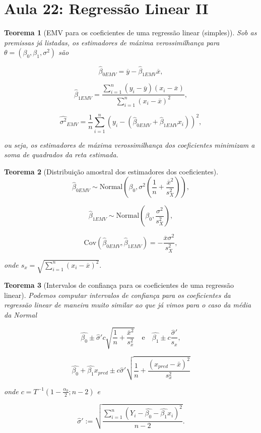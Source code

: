 \documentclass{article}
\newtheorem{theorem}{Teorema}
\begin{document}
\section*{Aula 22: Regressão Linear II}\label{s22}
\begin{theorem}[EMV para os coeficientes de uma regressão linear (simples)]
Sob as premissas já listadas, os estimadores de máxima verossimilhança para $\theta = (\beta_0, \beta_1, \sigma^2)$ são

$$\hat{\beta}_{0 EMV} = \overline{y} - \hat{\beta}_{1 EMV} \overline{x},$$

$$\hat{\beta}_{1 EMV} = \frac{\sum_{i = 1}^n (y_i - \overline{y})(x_i - \overline{x})}{\sum_{i = 1}^n (x_i - \overline{x})^2},$$

$$\hat{\sigma^2}_{EMV} = \frac{1}{n} \sum_{i = 1}^n \left ( y_i - (\hat{\beta}_{0 EMV} + \hat{\beta}_{1 EMV} x_i) \right )^2,$$

ou seja, os estimadores de máxima verossimilhança dos coeficientes minimizam a soma de quadrados da reta estimada.
\end{theorem}

\begin{theorem}[Distribuição amostral dos estimadores dos coeficientes]
$$\hat{\beta}_{0 EMV} \sim \mathrm{Normal} \left ( \beta_0, \sigma^2 \left ( \frac{1}{n} + \frac{\overline{x}^2}{s_X^2} \right ) \right ),$$

$$\hat{\beta}_{1 EMV} \sim \mathrm{Normal} \left ( \beta_0, \frac{\sigma^ 2}{s_X^2} \right ),$$

$$\mathrm{Cov} (\hat{\beta}_{0 EMV}, \hat{\beta}_{1 EMV}) = - \frac{\overline{x} \sigma^2}{s_X^2},$$

onde $s_x = \sqrt{\sum_{i = 1}^n (x_i - \overline{x})^2}.$
\end{theorem}

\begin{theorem}[Intervalos de confiança para os coeficientes de uma regressão linear]
Podemos computar intervalos de confiança para os coeficientes da regressão linear
de maneira muito similar ao que já vimos para o caso da média da Normal

$$\hat{\beta_0} \pm \hat{\sigma}' c\sqrt{\frac{1}{n} + \frac{\bar{x}^2}{s_x^2}}\quad \mathrm{e}\quad \hat{\beta_1} \pm c\frac{\hat{\sigma}'}{s_x},$$

$$\hat{\beta_0} + \hat{\beta_1}x_{pred} \pm c \hat{\sigma}' \sqrt{\frac{1}{n} + \frac{\left(x_{pred}-\bar{x}\right)^2}{s_x^2} }$$

onde $c = T^{-1}(1-\frac{\alpha_0}{2}; n-2)$ e 

$$\hat{\sigma}' := \sqrt{\frac{\sum_{i=1}^n \left(Y_i - \hat{\beta_0} - \hat{\beta_1}x_i \right)^2}{n-2}}.
$$
\end{theorem}
\end{document}
